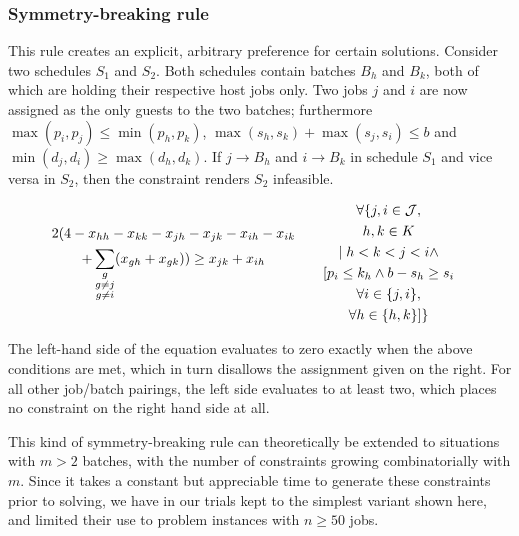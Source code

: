 \documentclass[oribibl]{llncs}
\begin{document}
\subsubsection{Symmetry-breaking rule}
This rule creates an explicit, arbitrary preference for certain solutions.
Consider two schedules $S_1$ and
$S_2$. Both schedules contain batches $B_h$ and $B_k$, both of which
are holding their respective host jobs only. Two jobs $j$ and $i$ are now
assigned as the only guests to the two batches; furthermore $\max(p_i, p_j) \leq
\min(p_h, p_k)$, $\max(s_h, s_k) + \max(s_j, s_i) \leq b$ and
$\min(d_j, d_i) \geq \max(d_h, d_k)$. If $j \rightarrow
B_h$ and $i \rightarrow B_k$ in schedule $S_1$ and vice versa in
$S_2$, then the constraint renders $S_2$ infeasible.

\begin{alignat}{2}
  & \begin{gathered} 2 (  4 - x_{hh} - x_{kk} - x_{jh} - x_{jk} -
x_{ih} - x_{ik}\hfill \\+ \sum_{\substack{{g}\\{g \neq j}\\{g \neq
i}}} (x_{gh} + x_{gk}) ) \geq x_{jk} + x_{ih} \end{gathered}
\quad && \begin{gathered} \forall\{ j, i \in \mathcal{J}, \\ h, k \in K \\|\; h < k <
j < i \land \\ [p_i \leq k_h \land b - s_h \geq s_i\\ \forall i \in
\{j,i\}, \\ \forall h
\in \{h,k\}] \} \end{gathered}
\end{alignat}

The left-hand side of the equation evaluates to zero exactly when the above
conditions are met, which in turn disallows the assignment given on the right.
For all other job/batch pairings, the left side evaluates to at least two, which
places no constraint on the right hand side at all.

This kind of symmetry-breaking rule can theoretically be extended to situations with
$m > 2$ batches, with the number of constraints growing combinatorially with $m$. Since it takes
a constant but appreciable time to generate these constraints prior to solving,
we have in our trials kept to the simplest variant shown here, and limited their
use to problem instances with $n \geq 50$ jobs.
\end{document}
